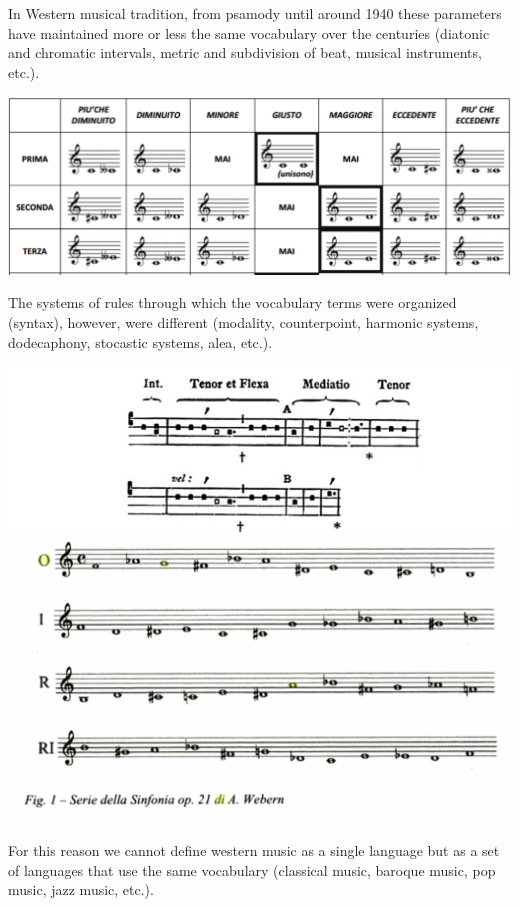In Western musical tradition, from psamody until around 1940 these parameters have maintained more or less the same vocabulary over the centuries (diatonic and chromatic intervals, metric and subdivision of beat, musical instruments, etc.).

\begin{center}
\includegraphics[scale=0.85]{../img/intervalli.png}
\end{center}

The systems of rules through which the vocabulary terms were organized (syntax), however, were different (modality, counterpoint, harmonic systems, dodecaphony, stocastic systems, alea, etc.).

\begin{center}
\includegraphics[scale=0.75]{../img/greg.png}
\end{center}

For this reason we cannot define western music as a single language but as a set of languages \hspace{0pt}\hspace{0pt}that use the same vocabulary (classical music, baroque music, pop music, jazz music, etc.).

